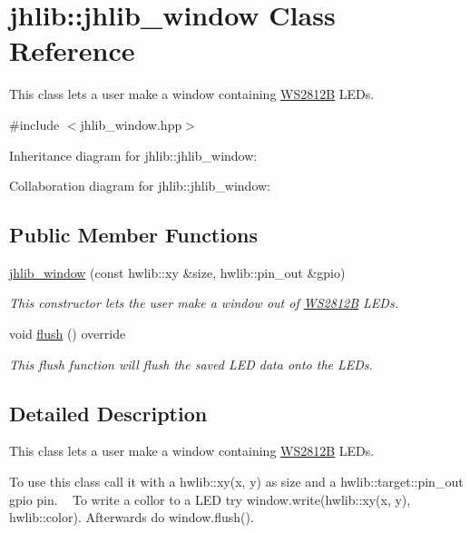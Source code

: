 \hypertarget{classjhlib_1_1jhlib__window}{}\section{jhlib\+:\+:jhlib\+\_\+window Class Reference}
\label{classjhlib_1_1jhlib__window}


This class lets a user make a window containing \hyperlink{classjhlib_1_1WS2812B}{W\+S2812B} L\+E\+Ds.  




{\ttfamily \#include $<$jhlib\+\_\+window.\+hpp$>$}



Inheritance diagram for jhlib\+:\+:jhlib\+\_\+window\+:


Collaboration diagram for jhlib\+:\+:jhlib\+\_\+window\+:
\subsection*{Public Member Functions}
\begin{DoxyCompactItemize}
\item 
\hyperlink{classjhlib_1_1jhlib__window_ac2679bd5cd146f19826ac694359f6f60}{jhlib\+\_\+window} (const hwlib\+::xy \&size, hwlib\+::pin\+\_\+out \&gpio)
\begin{DoxyCompactList}\small\item\em This constructor lets the user make a window out of \hyperlink{classjhlib_1_1WS2812B}{W\+S2812B} L\+E\+Ds. \end{DoxyCompactList}\item 
void \hyperlink{classjhlib_1_1jhlib__window_a99393d541e7e42b65c4a1b5421696118}{flush} () override
\begin{DoxyCompactList}\small\item\em This flush function will flush the saved L\+ED data onto the L\+E\+Ds. \end{DoxyCompactList}\end{DoxyCompactItemize}


\subsection{Detailed Description}
This class lets a user make a window containing \hyperlink{classjhlib_1_1WS2812B}{W\+S2812B} L\+E\+Ds. 

To use this class call it with a hwlib\+::xy(x, y) as size and a hwlib\+::target\+::pin\+\_\+out gpio pin. ~\newline
 To write a collor to a L\+ED try window.\+write(hwlib\+::xy(x, y), hwlib\+::color). Afterwards do window.\+flush(). 

